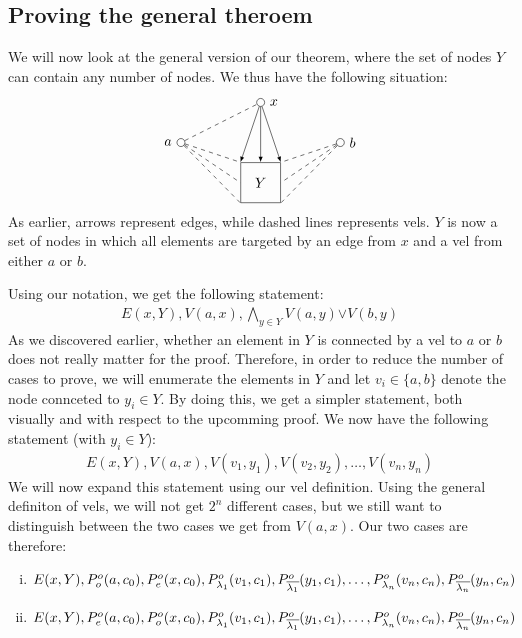 \subsection{Proving the general theroem}
\label{sub:Proving the general theroem}
We will now look at the general version of our theorem, where the set of nodes $Y$ can contain any number of nodes.  We thus have the following situation:
\[
\begin{tikzpicture}
  [
  point/.style={circle,draw,inner sep=0pt,minimum size=2mm},
  set/.style={rectangle,draw,inner sep=0pt,minimum size=10mm}
  ]
  \node (a) at (0,1) [point,label=left:$a$] {};
  \node (b) at (4,1) [point,label=right:$b$] {};

  \node (x) at (2,2) [point,label=right:$x$] {};
  \node (y) at (2,0) [set,label=center:$Y$] {};

  \draw [-latex] (x) to (y.north);
  \draw [-latex] (x) to (y.north west);
  \draw [-latex] (x) to (y.north east);
  \draw [dashed] (a) to (x);
  \draw [dashed] (a) to (y.west);
  \draw [dashed] (a) to (y.south west);
  \draw [dashed] (a) to (y.north west);
  \draw [dashed] (b) to (y.east);
  \draw [dashed] (b) to (y.north east);
  \draw [dashed] (b) to (y.south east);
\end{tikzpicture}
\]
As earlier, arrows represent edges, while dashed lines represents vels.
$Y$ is now a set of nodes in which all elements are targeted by an edge from $x$ and a vel from either $a$ or $b$.

Using our notation, we get the following statement:
\begin{align*}
  E(x,Y),V(a,x),\bigwedge_{y \in Y}V(a,y){\vee V(b,y)}
\end{align*}
As we discovered earlier, whether an element in $Y$ is connected by a vel to $a$ or $b$ does not really matter for the proof.
Therefore, in order to reduce the number of cases to prove, we will enumerate the elements in $Y$ and let $v_i \in \{a,b\}$ denote the node connceted to $y_i \in Y$. By doing this, we get a simpler statement, both visually and with respect to the upcomming proof.  We now have the following statement (with $y_i \in Y$):
\begin{align*}
  E(x,Y),V(a,x),V(v_1,y_1),V(v_2,y_2),\dots,V(v_n,y_n)
\end{align*}
We will now expand this statement using our vel definition.  Using the general definiton of vels, we will not get $2^n$ different cases, but we still want to distinguish between the two cases we get from $V(a,x)$.  Our two cases are therefore:
\begin{enumerate}[(i)]
  \item $E(x,Y),P^o_o(a,c_0),P^o_e(x,c_0),P^{o}_{\lambda_1}(v_1,c_1),P^{o}_{\overline{\lambda_1}}(y_1,c_1), \dots, P^{o}_{\lambda_n}(v_n,c_n),P^{o}_{\overline{\lambda_n}}(y_n,c_n)$
  \item $E(x,Y),P^o_e(a,c_0),P^o_o(x,c_0),P^{o}_{\lambda_1}(v_1,c_1),P^{o}_{\overline{\lambda_1}}(y_1,c_1), \dots, P^{o}_{\lambda_n}(v_n,c_n),P^{o}_{\overline{\lambda_n}}(y_n,c_n)$
\end{enumerate}
